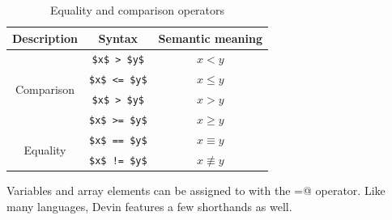 \documentclass[UdineBachThesis,american,11pt]{PhdThesis}
\begin{document}
  \begin{table}[h]
    \centering

    \begin{tabular}{|c|c|c|}
      \hline

      Description &
      Syntax &
      Semantic meaning \\
      \hline

      \multirow{4}{*}{Comparison} &
      \lstinline[mathescape]@$x$ > $y$@ &
      $x < y$ \\

      &
      \lstinline[mathescape]@$x$ <= $y$@ &
      $x \leq y$ \\

      &
      \lstinline[mathescape]@$x$ > $y$@ &
      $x > y$ \\

      &
      \lstinline[mathescape]@$x$ >= $y$@ &
      $x \geq y$ \\

      \multirow{2}{*}{Equality} &
      \lstinline[mathescape]@$x$ == $y$@ &
      $x \equiv y$ \\

      &
      \lstinline[mathescape]@$x$ != $y$@ &
      $x \not\equiv y$ \\
      \hline
    \end{tabular}

    \caption{Equality and comparison operators}
  \end{table}

  Variables and array elements can be assigned to with the \lstinline@=@
  operator. Like many languages, Devin features a few shorthands as well.
\end{document}
